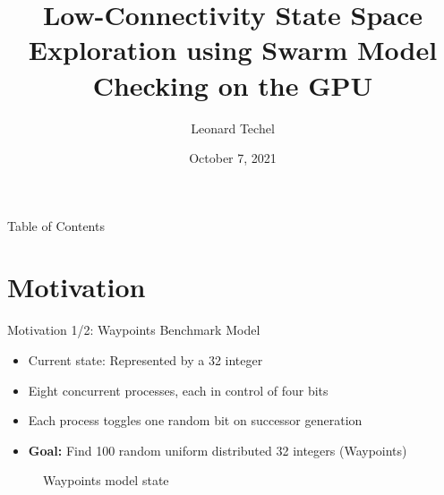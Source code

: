 \documentclass[aspectratio=169]{beamer}
\author{Leonard Techel}
\title{Low-Connectivity State Space Exploration using Swarm Model Checking on the GPU}
\date{October 7, 2021}
\begin{document}
\maketitle

\begin{frame}{Table of Contents}
    \tableofcontents
\end{frame}

\section{Motivation}

\begin{frame}{Motivation 1/2: Waypoints Benchmark Model}
    \begin{itemize}
        \item Current state: Represented by a \SI{32}{\bit} integer
        \item Eight concurrent processes, each in control of four bits
        \item Each process toggles one random bit on successor generation
        \item \textbf{Goal:} Find 100 random uniform distributed \SI{32}{\bit} integers (Waypoints)
    \end{itemize}

    \medskip

    \begin{figure}
        \vspace{\baselineskip}
        \caption{Waypoints model state}
        \label{fig:waypoints-model}
    \end{figure}
\end{frame}
\end{document}
